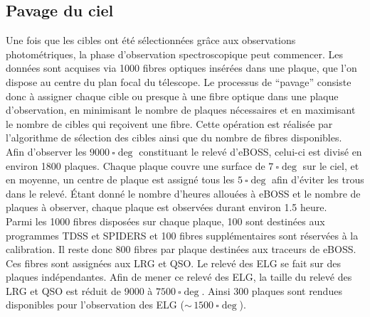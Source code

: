 \subsection{Pavage du ciel}

Une fois que les cibles ont été sélectionnées grâce aux observations photométriques, la phase d'observation spectroscopique peut commencer. Les données sont acquises via \num{1000} fibres optiques insérées dans une plaque, que l'on dispose au centre du plan focal du télescope. 
Le processus de ``pavage'' \autocite{Blanton2001} consiste donc à assigner chaque cible ou presque à une fibre optique dans une plaque d'observation, en minimisant le nombre de plaques nécessaires et en maximisant le nombre de cibles qui reçoivent une fibre. Cette opération est réalisée par l'algorithme de sélection des cibles ainsi que du nombre de fibres disponibles. \\
Afin d'observer les $\SI{9000}{\square\deg}$ constituant le relevé d'eBOSS, celui-ci est divisé en environ \num{1800} plaques. Chaque plaque couvre une surface de $\SI{7}{\square\deg}$ sur le ciel, et en moyenne, un centre de plaque est assigné tous les $\SI{5}{\square\deg}$ afin d'éviter les trous dans le relevé. Étant donné le nombre d'heures allouées à eBOSS et le nombre de plaques à observer, chaque plaque est observées durant environ \num{1,5} heure. \\
Parmi les \num{1000} fibres disposées sur chaque plaque, \num{100} sont destinées aux programmes TDSS et SPIDERS et \num{100} fibres supplémentaires sont réservées à la calibration. Il reste donc \num{800} fibres par plaque destinées aux traceurs de eBOSS. Ces fibres sont assignées aux LRG et QSO. Le relevé des ELG se fait sur des plaques indépendantes. Afin de mener ce relevé des ELG, la taille du relevé des LRG et QSO est réduit de \num{9000} à $\SI{7500}{\square\deg}$. Ainsi \num{300} plaques sont rendues disponibles pour l'observation des ELG ($\sim\,\SI{1500}{\square\deg}$).


